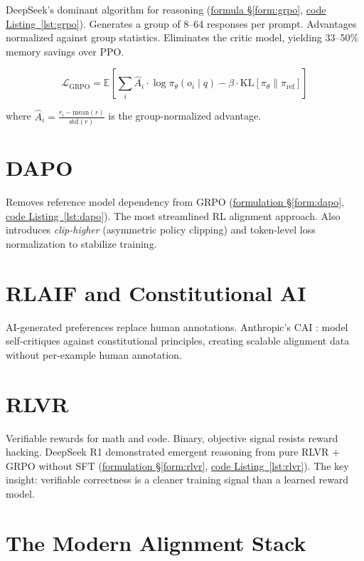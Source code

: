 DeepSeek's dominant algorithm for reasoning \parencite{guo2025deepseekr1} (\hyperref[form:grpo]{formula \S\ref*{form:grpo}}, \hyperref[lst:grpo]{code Listing~\ref*{lst:grpo}}). Generates a group of 8--64 responses per prompt. Advantages normalized against group statistics. Eliminates the critic model, yielding 33--50\% memory savings over PPO.

\[
\mathcal{L}_\text{GRPO} = \mathbb{E}\left[\sum_i \hat{A}_i \cdot \log \pi_\theta(o_i \mid q) - \beta \cdot \text{KL}[\pi_\theta \| \pi_\text{ref}]\right]
\]

where $\hat{A}_i = \frac{r_i - \text{mean}(r)}{\text{std}(r)}$ is the group-normalized advantage.

\section{DAPO}

Removes reference model dependency from GRPO \parencite{yu2025dapo} (\hyperref[form:dapo]{formulation \S\ref*{form:dapo}}, \hyperref[lst:dapo]{code Listing~\ref*{lst:dapo}}). The most streamlined RL alignment approach. Also introduces \emph{clip-higher} (asymmetric policy clipping) and token-level loss normalization to stabilize training.

\section{RLAIF and Constitutional AI}

AI-generated preferences replace human annotations. Anthropic's CAI \parencite{bai2022constitutional}: model self-critiques against constitutional principles, creating scalable alignment data without per-example human annotation.

\section{RLVR}

Verifiable rewards for math and code. Binary, objective signal resists reward hacking. DeepSeek R1 demonstrated emergent reasoning from pure RLVR + GRPO without SFT (\hyperref[form:rlvr]{formulation \S\ref*{form:rlvr}}, \hyperref[lst:rlvr]{code Listing~\ref*{lst:rlvr}}). The key insight: verifiable correctness is a cleaner training signal than a learned reward model.

\section{The Modern Alignment Stack}

